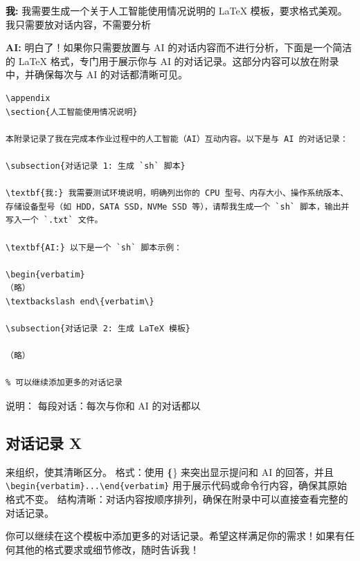 \documentclass[a4paper]{article}
\begin{document}
\begin{tcolorbox}[colframe=blue!30!white, colback=blue!5!white, coltitle=black, title=对话内容]
\textbf{我:} 我需要生成一个关于人工智能使用情况说明的 LaTeX 模板，要求格式美观。我只需要放对话内容，不需要分析

\textbf{AI:} 明白了！如果你只需要放置与 AI 的对话内容而不进行分析，下面是一个简洁的 LaTeX 格式，专门用于展示你与 AI 的对话记录。这部分内容可以放在附录中，并确保每次与 AI 的对话都清晰可见。
\begin{lstlisting}[breaklines=true, basicstyle=\ttfamily\small]
%--------------------------人工智能使用情况说明--------------------------------
\appendix
\section{人工智能使用情况说明}

本附录记录了我在完成本作业过程中的人工智能（AI）互动内容。以下是与 AI 的对话记录：

\subsection{对话记录 1: 生成 `sh` 脚本}

\textbf{我:} 我需要测试环境说明，明确列出你的 CPU 型号、内存大小、操作系统版本、存储设备型号（如 HDD，SATA SSD，NVMe SSD 等），请帮我生成一个 `sh` 脚本，输出并写入一个 `.txt` 文件。

\textbf{AI:} 以下是一个 `sh` 脚本示例：

\begin{verbatim}
（略）
\textbackslash end\{verbatim\}

\subsection{对话记录 2: 生成 LaTeX 模板}

（略）

% 可以继续添加更多的对话记录
\end{lstlisting}

说明：
每段对话：每次与你和 AI 的对话都以 \subsection{对话记录 X} 来组织，使其清晰区分。
格式：使用 \textbf\{\} 来突出显示提问和 AI 的回答，并且 \verb|\begin{verbatim}...\end{verbatim}| 用于展示代码或命令行内容，确保其原始格式不变。
结构清晰：对话内容按顺序排列，确保在附录中可以直接查看完整的对话记录。

你可以继续在这个模板中添加更多的对话记录。希望这样满足你的需求！如果有任何其他的格式要求或细节修改，随时告诉我！
\end{tcolorbox}
\end{document}
